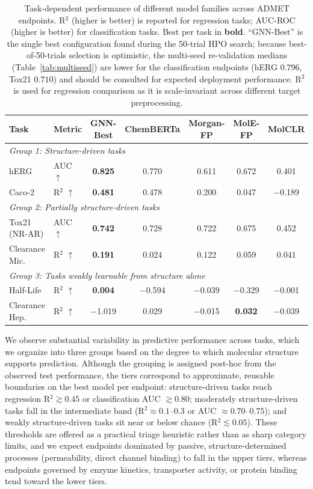 \documentclass[journal]{IEEEtran}
\begin{document}
\begin{table}[!t]
\centering
\caption{Task-dependent performance of different model families across ADMET endpoints. R$^2$ (higher is better) is reported for regression tasks; AUC-ROC (higher is better) for classification tasks. Best per task in \textbf{bold}. ``GNN-Best'' is the single best configuration found during the 50-trial HPO search; because best-of-50-trials selection is optimistic, the multi-seed re-validation medians (Table~\ref{tab:multiseed}) are lower for the classification endpoints (hERG $0.796$, Tox21 $0.710$) and should be consulted for expected deployment performance. R$^2$ is used for regression comparison as it is scale-invariant across different target preprocessing.}
\label{tab:model_comparison}
\small
\begin{tabular}{llccccc}
\toprule
\textbf{Task} & \textbf{Metric} & \textbf{GNN-Best} & \textbf{ChemBERTa} & \textbf{Morgan-FP} & \textbf{MolE-FP} & \textbf{MolCLR} \\
\midrule
\multicolumn{7}{l}{\emph{Group 1: Structure-driven tasks}} \\
\midrule
hERG & AUC $\uparrow$ & \textbf{0.825} & 0.770 & 0.611 & 0.672 & 0.401 \\
Caco-2 & R$^2$ $\uparrow$ & \textbf{0.481} & 0.478 & 0.200 & 0.047 & $-$0.189 \\
\midrule
\multicolumn{7}{l}{\emph{Group 2: Partially structure-driven tasks}} \\
\midrule
Tox21 (NR-AR) & AUC $\uparrow$ & \textbf{0.742} & 0.728 & 0.722 & 0.675 & 0.452 \\
Clearance Mic. & R$^2$ $\uparrow$ & \textbf{0.191} & 0.024 & 0.122 & 0.059 & 0.041 \\
\midrule
\multicolumn{7}{l}{\emph{Group 3: Tasks weakly learnable from structure alone}} \\
\midrule
Half-Life & R$^2$ $\uparrow$ & \textbf{0.004} & $-$0.594 & $-$0.039 & $-$0.329 & $-$0.001 \\
Clearance Hep. & R$^2$ $\uparrow$ & $-$1.019 & 0.029 & $-$0.015 & \textbf{0.032} & $-$0.039 \\
\bottomrule
\end{tabular}
\end{table}


We observe substantial variability in predictive performance across tasks, which we organize into three groups based on the degree to which molecular structure supports prediction. Although the grouping is assigned post-hoc from the observed test performance, the tiers correspond to approximate, reusable boundaries on the best model per endpoint: structure-driven tasks reach regression R$^2 \gtrsim 0.45$ or classification AUC $\gtrsim 0.80$; moderately structure-driven tasks fall in the intermediate band (R$^2 \approx 0.1$--$0.3$ or AUC $\approx 0.70$--$0.75$); and weakly structure-driven tasks sit near or below chance (R$^2 \lesssim 0.05$). These thresholds are offered as a practical triage heuristic rather than as sharp category limits, and we expect endpoints dominated by passive, structure-determined processes (permeability, direct channel binding) to fall in the upper tiers, whereas endpoints governed by enzyme kinetics, transporter activity, or protein binding tend toward the lower tiers.
\end{document}
